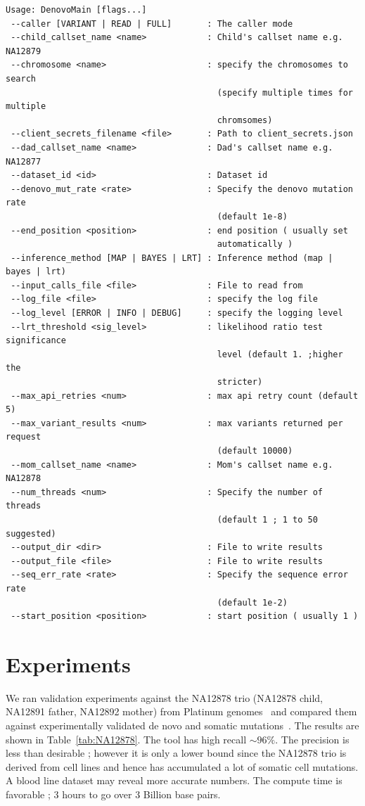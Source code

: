 \documentclass{article}
\begin{document}
\begin{verbatim}
Usage: DenovoMain [flags...]
 --caller [VARIANT | READ | FULL]       : The caller mode
 --child_callset_name <name>            : Child's callset name e.g. NA12879
 --chromosome <name>                    : specify the chromosomes to search
                                          (specify multiple times for multiple
                                          chromsomes)
 --client_secrets_filename <file>       : Path to client_secrets.json
 --dad_callset_name <name>              : Dad's callset name e.g. NA12877
 --dataset_id <id>                      : Dataset id
 --denovo_mut_rate <rate>               : Specify the denovo mutation rate
                                          (default 1e-8)
 --end_position <position>              : end position ( usually set
                                          automatically )
 --inference_method [MAP | BAYES | LRT] : Inference method (map | bayes | lrt)
 --input_calls_file <file>              : File to read from
 --log_file <file>                      : specify the log file
 --log_level [ERROR | INFO | DEBUG]     : specify the logging level
 --lrt_threshold <sig_level>            : likelihood ratio test significance
                                          level (default 1. ;higher the
                                          stricter)
 --max_api_retries <num>                : max api retry count (default 5)
 --max_variant_results <num>            : max variants returned per request
                                          (default 10000)
 --mom_callset_name <name>              : Mom's callset name e.g. NA12878
 --num_threads <num>                    : Specify the number of threads
                                          (default 1 ; 1 to 50 suggested)
 --output_dir <dir>                     : File to write results
 --output_file <file>                   : File to write results
 --seq_err_rate <rate>                  : Specify the sequence error rate
                                          (default 1e-2)
 --start_position <position>            : start position ( usually 1 )
\end{verbatim}


\section{Experiments}
\label{experiments}
We ran validation experiments against the NA12878 trio (NA12878 child, NA12891 father, NA12892 mother) from Platinum genomes~\cite{platinum} and compared them against experimentally validated de novo and somatic mutations~\cite{Conrad2011}. The results are shown in Table~\ref{tab:NA12878}. The tool has high recall $\sim 96\%$. The precision is less than desirable ; however it is only a lower bound since the NA12878 trio is derived from cell lines and hence has accumulated a lot of somatic cell mutations. A blood line dataset may reveal more accurate numbers. The compute time is favorable ; 3 hours to go over 3 Billion base pairs. 
\end{document}
